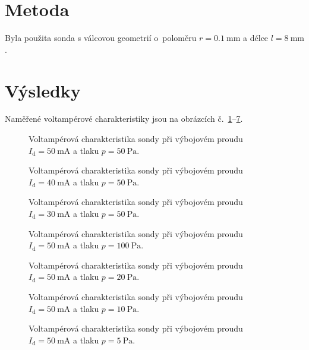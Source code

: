 \documentclass{protokol}
\newcommand\pres{p}
\newcommand\idisch{I_\mathrm{d}}
\begin{document}
\section{Metoda}
Byla použita sonda s válcovou geometrií
o~poloměru $r=\SI{0.1}{\milli\metre}$ a délce $l=\SI{8}{\milli\metre}$.

\section{Výsledky}
Naměřené voltampérové charakteristiky jsou na obrázcích
č.~\ref{fig:vac-1}--\ref{fig:vac-6}.

\newcommand\figvac[3]{
	\begin{figure}[htp]
		\centering
		
		
		\caption{Voltampérová charakteristika sondy
			při výbojovém proudu $\idisch = \SI{#2}{\milli\ampere}$
			a tlaku $\pres = \SI{#3}{\pascal}$.}
		\label{fig:vac-#1}
	\end{figure}
}

\figvac{1}{50}{50}
\figvac{2}{40}{50}
\figvac{3}{30}{50}

\figvac{7}{50}{100}
\figvac{4}{50}{20}
\figvac{5}{50}{10}
\figvac{6}{50}{5}

\printbibliography
\end{document}
